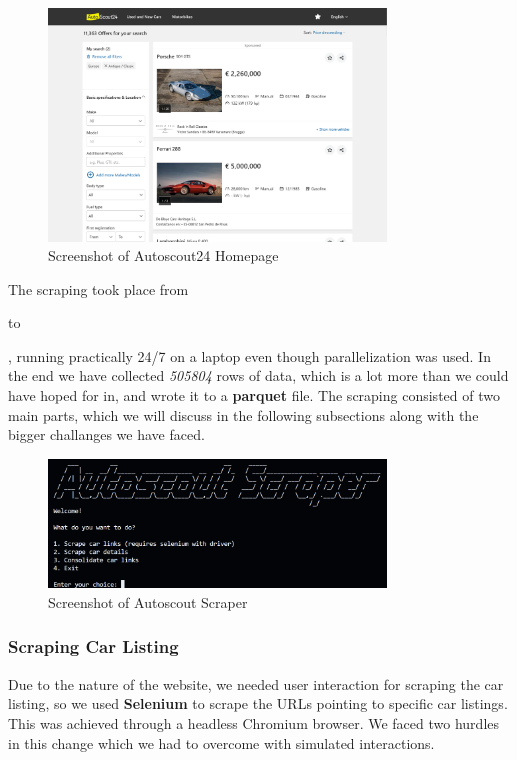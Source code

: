 \documentclass[12pt]{article}
\begin{document}
\begin{figure}[ht]
  \centering
  \includegraphics[width=0.8\textwidth]{./images/autoscout.png}
  \caption{Screenshot of Autoscout24 Homepage}
  \label{fig:autoscout}
\end{figure}

The scraping took place from \date{2025-04-03} to \date{2025-04-08}, running practically 24/7 on a laptop even though parallelization was used. In the end we have collected \textit{505804} rows of data, which is a lot more than we could have hoped for in, and wrote it to a \textbf{parquet} file. The scraping consisted of two main parts, which we will discuss in the following subsections along with the bigger challanges we have faced.

\begin{figure}[ht]
  \centering
  \includegraphics[width=0.8\textwidth]{./images/autoscout_scraper.png}
  \caption{Screenshot of Autoscout Scraper}
  \label{fig:autoscout_scraper}
\end{figure}

\subsubsection{Scraping Car Listing}

Due to the nature of the website, we needed user interaction for scraping the car listing, so we used \textbf{Selenium} to scrape the URLs pointing to specific car listings. This was achieved through a headless Chromium browser.
We faced two hurdles in this change which we had to overcome with simulated interactions.
\end{document}
